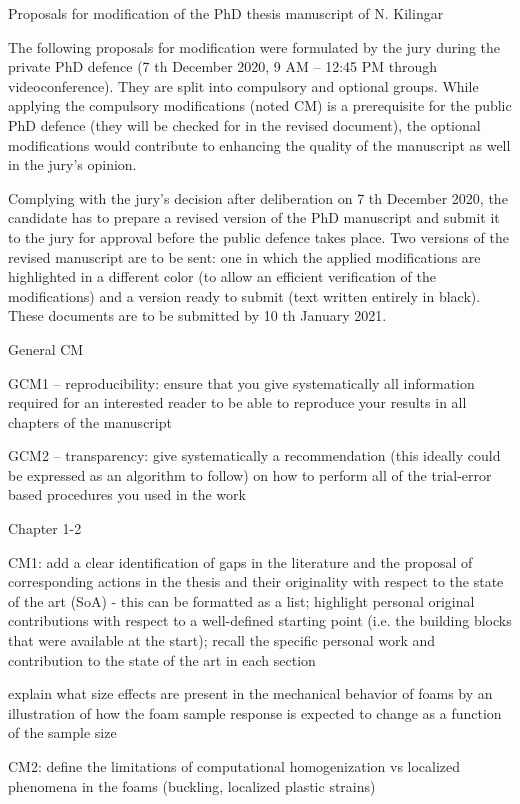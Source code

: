 Proposals for modification of the PhD thesis manuscript of
N. Kilingar

The following proposals for modification were formulated by the jury during the private PhD
defence (7 th December 2020, 9 AM – 12:45 PM through videoconference). They are split
into compulsory and optional groups. While applying the compulsory modifications (noted
CM) is a prerequisite for the public PhD defence (they will be checked for in the revised
document), the optional modifications would contribute to enhancing the quality of the
manuscript as well in the jury’s opinion.

Complying with the jury’s decision after deliberation on 7 th December 2020, the candidate
has to prepare a revised version of the PhD manuscript and submit it to the jury for
approval before the public defence takes place. Two versions of the revised manuscript
are to be sent: one in which the applied modifications are highlighted in a different color (to
allow an efficient verification of the modifications) and a version ready to submit (text
written entirely in black). These documents are to be submitted by 10 th January 2021.

General CM

GCM1 – reproducibility: ensure that you give systematically all information
required for an interested reader to be able to reproduce your results in all chapters
of the manuscript

GCM2 – transparency: give systematically a recommendation (this ideally could be
expressed as an algorithm to follow) on how to perform all of the trial-error based
procedures you used in the work

Chapter 1-2

CM1: add a clear identification of gaps in the literature and the proposal of
corresponding actions in the thesis and their originality with respect to the state of
the art (SoA) - this can be formatted as a list; highlight personal original
contributions with respect to a well-defined starting point (i.e. the building blocks
that were available at the start); recall the specific personal work and contribution to
the state of the art in each section

explain what size effects are present in the mechanical behavior of foams by an
illustration of how the foam sample response is expected to change as a function of
the sample size

CM2: define the limitations of computational homogenization vs localized
phenomena in the foams (buckling, localized plastic strains)

